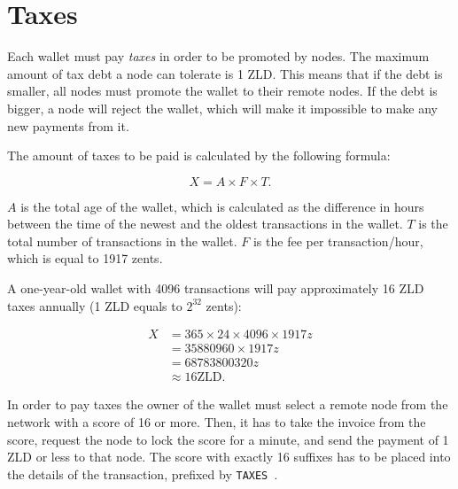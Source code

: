\documentclass[11pt,oneside]{article}
\newcommand\dd[1]{\colorbox{gray!30}{\texttt{#1}}}
\begin{document}
\section{Taxes}\label{sec:taxes}

Each wallet must pay \emph{taxes} in order to be promoted by nodes.
The maximum amount of tax debt a node can tolerate is 1 ZLD. This means
that if the debt is smaller, all nodes must promote the wallet to their
remote nodes. If the debt is bigger, a node will reject the wallet,
which will make it impossible to make any new payments from it.

The amount of taxes to be paid is calculated by the following formula:

\begin{equation}
X = A \times F \times T.
\end{equation}

$A$ is the total age of the wallet,
which is calculated as the difference in hours between the time of the newest and
the oldest transactions in the wallet.
$T$ is the total number of transactions in the wallet.
$F$ is the fee per transaction/hour, which is equal to 1917 zents.

A one-year-old wallet with 4096 transactions will pay approximately 16 ZLD taxes annually
(1 ZLD equals to $2^{32}$ zents):

\begin{equation}
\begin{split}
X & = 365 \times 24 \times 4096 \times 1917z \\
  & = \text{35880960} \times 1917z \\
  & = \text{68783800320}z \\
  & \approx 16 \text{ZLD}.
\end{split}
\end{equation}

In order to pay taxes the owner of the wallet must select a remote
node from the network with a score of 16 or more. Then, it has to
take the invoice from the score, request the node to lock the score
for a minute, and send the payment of 1 ZLD or less
to that node. The score with exactly 16 suffixes
has to be placed into the details of the transaction,
prefixed by \dd{TAXES }.
\end{document}
